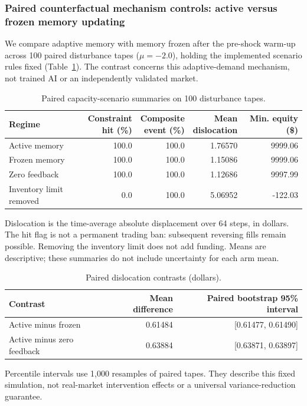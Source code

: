 \documentclass[10pt,twocolumn,letterpaper]{article}
\theoremstyle{definition}
\theoremstyle{remark}
\begin{document}
\subsubsection{Paired counterfactual mechanism controls: active versus frozen memory updating}
\label{sec:paired_mechanism_controls}
We compare adaptive memory with memory frozen after the pre-shock warm-up across 100 paired disturbance tapes ($\mu=-2.0$), holding the implemented scenario rules fixed (Table~\ref{tab:funded_controls}). The contrast concerns this adaptive-demand mechanism, not trained AI or an independently validated market.

\begin{table}[htbp]\centering\small
\caption{Paired capacity-scenario summaries on 100 disturbance tapes.}
\label{tab:funded_controls}
\begin{tabular*}{\textwidth}{@{\extracolsep{\fill}}lrrrr@{}}
\toprule
Regime & \shortstack{Constraint\\hit (\%)} & \shortstack{Composite\\event (\%)} & \shortstack{Mean\\dislocation} & \shortstack{Min. equity\\(\$)} \\
\midrule
Active memory & 100.0 & 100.0 & 1.76570 & 9999.06 \\
Frozen memory & 100.0 & 100.0 & 1.15086 & 9999.06 \\
Zero feedback & 100.0 & 100.0 & 1.12686 & 9997.99 \\
Inventory limit removed & 0.0 & 100.0 & 5.06952 & -122.03 \\
\bottomrule\end{tabular*}
\par\smallskip\begin{minipage}{\textwidth}\footnotesize Dislocation is the time-average absolute displacement over 64 steps, in dollars. The hit flag is not a permanent trading ban: subsequent reversing fills remain possible. Removing the inventory limit does not add funding. Means are descriptive; these summaries do not include uncertainty for each arm mean.\end{minipage}
\end{table}
\begin{table}[htbp]\centering\small
\caption{Paired dislocation contrasts (dollars).}
\label{tab:funded_paired_contrasts}
\begin{tabular*}{\textwidth}{@{\extracolsep{\fill}}lrr@{}}
\toprule
Contrast & Mean difference & Paired bootstrap 95\% interval \\
\midrule
Active minus frozen & 0.61484 & [0.61477, 0.61490] \\
Active minus zero feedback & 0.63884 & [0.63871, 0.63897] \\
\bottomrule\end{tabular*}
\par\smallskip\begin{minipage}{\textwidth}\footnotesize Percentile intervals use 1,000 resamples of paired tapes. They describe this fixed simulation, not real-market intervention effects or a universal variance-reduction guarantee.\end{minipage}
\end{table}
\end{document}
